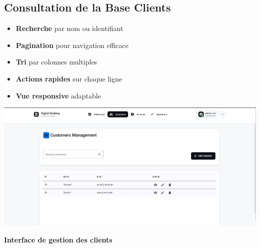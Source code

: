\documentclass[10pt]{article}
\begin{document}
\subsection{Consultation de la Base Clients}

\begin{minipage}{\textwidth}
    \begin{minipage}{0.32\textwidth}
        \begin{tcolorbox}[
            enhanced,
            colback=tertiary!5,
            colframe=tertiary,
            arc=5pt,
            title=Fonctionnalités de consultation,
            fonttitle=\small\bfseries\sffamily\color{white},
            coltitle=white,
            colbacktitle=tertiary
        ]
            \begin{itemize}[leftmargin=12pt, itemsep=3pt, font=\small\sffamily]
                \item \textbf{Recherche} par nom ou identifiant
                \item \textbf{Pagination} pour navigation efficace
                \item \textbf{Tri} par colonnes multiples
                \item \textbf{Actions rapides} sur chaque ligne
                \item \textbf{Vue responsive} adaptable
            \end{itemize}
        \end{tcolorbox}
    \end{minipage}
    \hfill
    \begin{minipage}{0.65\textwidth}
        \begin{imagebox}
            \includegraphics[width=\textwidth]{screenshots/04_01_customer_list_initial.png}
            \caption*{\textbf{\sffamily Interface de gestion des clients}}
        \end{imagebox}
    \end{minipage}
\end{minipage}
\end{document}
